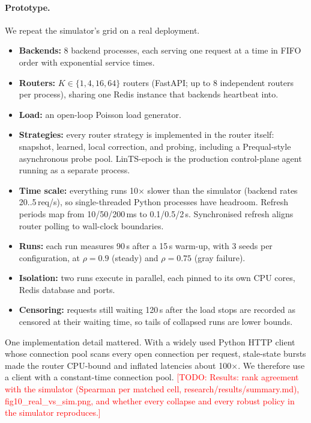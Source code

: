 \documentclass[10pt,twocolumn,letterpaper]{article}
\newcommand{\TODO}[1]{\textcolor{red}{[TODO: #1]}}
\begin{document}
\paragraph{Prototype.} We repeat the simulator's grid on a real deployment.
\begin{itemize}
\item \textbf{Backends:} 8 backend processes, each serving one request at a
  time in FIFO order with exponential service times.
\item \textbf{Routers:} $K\in\{1,4,16,64\}$ routers (FastAPI;
  up to 8 independent routers per process), sharing one Redis instance
  that backends heartbeat into.
\item \textbf{Load:} an open-loop Poisson load generator.
\item \textbf{Strategies:} every router strategy is implemented in the
  router itself: snapshot, learned, local correction, and probing,
  including a Prequal-style asynchronous probe pool. LinTS-epoch is the
  production control-plane agent running as a separate process.
\item \textbf{Time scale:} everything runs 10$\times$ slower than the
  simulator (backend rates 20..5\,req/s), so single-threaded Python processes
  have headroom. Refresh periods map from 10/50/200\,ms to 0.1/0.5/2\,s.
  Synchronised refresh aligns router polling to wall-clock boundaries.
\item \textbf{Runs:} each run measures 90\,s after a 15\,s warm-up, with 3
  seeds per configuration, at $\rho=0.9$ (steady) and $\rho=0.75$ (gray
  failure).
\item \textbf{Isolation:} two runs execute in parallel, each pinned to its
  own CPU cores, Redis database and ports.
\item \textbf{Censoring:} requests still waiting 120\,s after the load stops
  are recorded as censored at their waiting time, so tails of collapsed
  runs are lower bounds.
\end{itemize}
One implementation detail mattered. With a widely used Python HTTP client
whose connection pool scans every open connection per request, stale-state
bursts made the router CPU-bound and inflated latencies about 100$\times$.
We therefore use a client with a constant-time connection pool.
\TODO{Results: rank agreement with the simulator (Spearman per matched cell,
research/results/summary.md), fig10\_real\_vs\_sim.png, and whether every
collapse and every robust policy in the simulator reproduces.}
\fi

\end{document}
